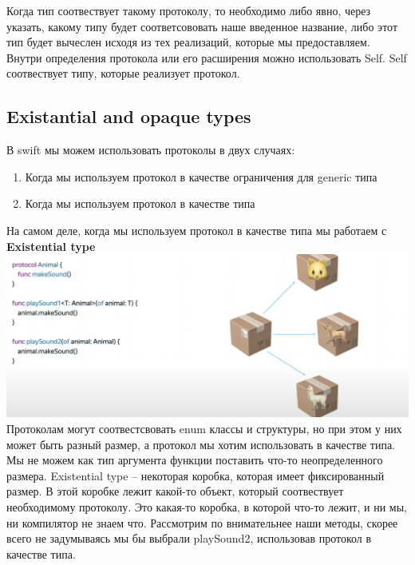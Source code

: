 \documentclass{article}
\begin{document}
    \newline
    Когда тип соотвествует такому протоколу, то необходимо либо явно, через  указать, какому типу будет соответсововать наше введенное название, либо этот тип будет вычеслен исходя из тех реализаций, которые мы предоставляем. 
    \newline
    Внутри определения протокола или его расширения можно использовать Self. Self соотвествует типу, которые реализует протокол. 
    \newline
    \subsection{Existantial and opaque types}
    В swift мы можем использовать протоколы в двух случаях: 
    \begin{enumerate}
        \item Когда мы используем протокол в качестве ограничения для generic типа
        \item Когда мы используем протокол в качестве типа
    \end{enumerate}
    На самом деле, когда мы используем протокол в качестве типа мы работаем с \textbf{Existential type}
    \newline
    \includegraphics[scale = 0.5]{pic/Снимок экрана 2023-07-28 в 22.53.28.png}
    \newline
    Протоколам могут соотвестсвовать enum классы и структуры, но при этом у них может быть разный размер, а протокол мы хотим использовать в качестве типа. 
    \newline
    Мы не можем как тип аргумента функции поставить что-то неопределенного размера. Existential type -- некоторая коробка, которая имеет фиксированный размер. В этой коробке лежит какой-то объект, который соотвествует необходимому протоколу. 
    \newline
    Это какая-то коробка, в которой что-то лежит, и ни мы, ни компилятор не знаем что. Рассмотрим по внимательнее наши методы, скорее всего не задумываясь мы бы выбрали playSound2, использовав протокол в качестве типа. 
\end{document}
